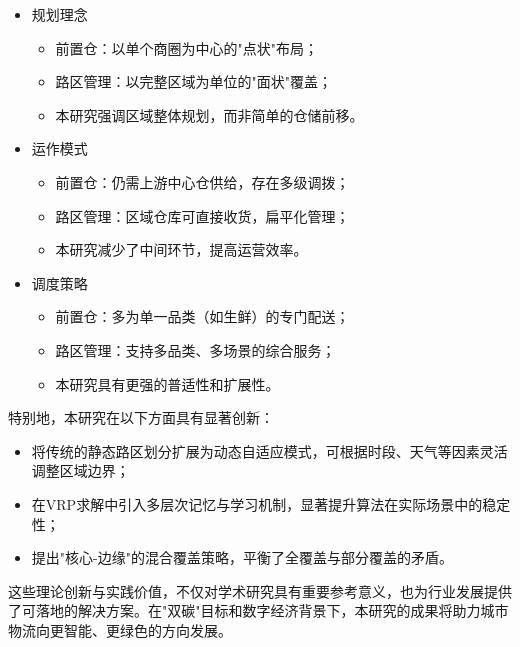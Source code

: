 \documentclass[12pt,a4paper,twoside]{ctexbook}
\begin{document}
\begin{itemize}
    \item 规划理念
    \begin{itemize}
        \item 前置仓：以单个商圈为中心的"点状"布局；
        \item 路区管理：以完整区域为单位的"面状"覆盖；
        \item 本研究强调区域整体规划，而非简单的仓储前移。
    \end{itemize}
    
    \item 运作模式
    \begin{itemize}
        \item 前置仓：仍需上游中心仓供给，存在多级调拨；
        \item 路区管理：区域仓库可直接收货，扁平化管理；
        \item 本研究减少了中间环节，提高运营效率。
    \end{itemize}
    
    \item 调度策略
    \begin{itemize}
        \item 前置仓：多为单一品类（如生鲜）的专门配送；
        \item 路区管理：支持多品类、多场景的综合服务；
        \item 本研究具有更强的普适性和扩展性。
    \end{itemize}
\end{itemize}

特别地，本研究在以下方面具有显著创新：
\begin{itemize}
    \item 将传统的静态路区划分扩展为动态自适应模式，可根据时段、天气等因素灵活调整区域边界；
    \item 在VRP求解中引入多层次记忆与学习机制，显著提升算法在实际场景中的稳定性；
    \item 提出"核心-边缘"的混合覆盖策略，平衡了全覆盖与部分覆盖的矛盾。
\end{itemize}

这些理论创新与实践价值，不仅对学术研究具有重要参考意义，也为行业发展提供了可落地的解决方案。在"双碳"目标和数字经济背景下，本研究的成果将助力城市物流向更智能、更绿色的方向发展。
\end{document}
